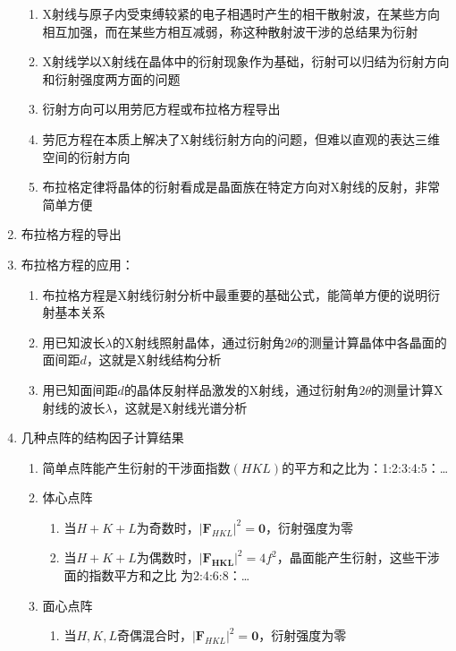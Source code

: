 \documentclass[12pt,a4paper]{article}
\begin{document}
\begin{enumerate}
\begin{enumerate}
                \item X射线与原子内受束缚较紧的电子相遇时产生的相干散射波，在某些方向相互加强，而在某些方相互减弱，称这种散射波干涉的总结果为衍射
                \item X射线学以X射线在晶体中的衍射现象作为基础，衍射可以归结为衍射方向和衍射强度两方面的问题
                \item 衍射方向可以用劳厄方程或布拉格方程导出
                \item 劳厄方程在本质上解决了X射线衍射方向的问题，但难以直观的表达三维空间的衍射方向
                \item 布拉格定律将晶体的衍射看成是晶面族在特定方向对X射线的反射，非常简单方便
            \end{enumerate}
        \item 布拉格方程的导出
        \item 布拉格方程的应用：
        \begin{enumerate}
            \item 布拉格方程是X射线衍射分析中最重要的基础公式，能简单方便的说明衍射基本关系
            \item 用已知波长$\lambda$的X射线照射晶体，通过衍射角$2\theta$的测量计算晶体中各晶面的面间距$d$，这就是X射线结构分析
            \item 用已知面间距$d$的晶体反射样品激发的X射线，通过衍射角$2\theta$的测量计算X射线的波长$\lambda$，这就是X射线光谱分析 
        \end{enumerate}
        \item 几种点阵的结构因子计算结果
        \begin{enumerate}
            \item 简单点阵能产生衍射的干涉面指数$(HKL)$的平方和之比为：1:2:3:4:5：\dots
            \item 体心点阵
            \begin{enumerate}
                \item 当$H+K+L$为奇数时，$\left|\boldsymbol{F}_{H K L}\right|^{2}=\mathbf{0}$，衍射强度为零
                \item 当$H+K+L$为偶数时，$\left|\boldsymbol{F}_{\boldsymbol{H K L}}\right|^{2}=4 f^{2}$，晶面能产生衍射，这些干涉面的指数平方和之比
                    为2:4:6:8：\dots
            \end{enumerate}
            \item 面心点阵
            \begin{enumerate}
                \item 当$H,K,L$奇偶混合时，$\left|\boldsymbol{F}_{H K L}\right|^{2}=\mathbf{0}$，衍射强度为零

\end{enumerate}
\end{enumerate}
\end{enumerate}
\end{document}
